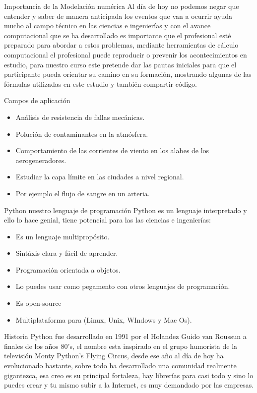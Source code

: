 \begin{frame}{Importancia de la Modelación numérica}
Al día de hoy no podemos negar que entender y saber de manera anticipada los eventos que van a ocurrir ayuda mucho al campo técnico en las ciencias e ingenierías y con el avance computacional que se ha desarrollado es importante que el profesional esté preparado para abordar a estos problemas, mediante herramientas de cálculo computacional el profesional puede reproducir o prevenir los acontecimientos en estudio, para nuestro curso este pretende dar las pautas iniciales para que el participante pueda orientar su camino en su formación, mostrando algunas de las fórmulas utilizadas en este estudio y también compartir código.
\end{frame}

\begin{frame}{Campos de aplicación}
\begin{itemize}
\item Análisis de resistencia de fallas mecánicas.
\item Polución de contaminantes en la atmósfera.
\item Comportamiento de las corrientes de viento en los alabes de los aerogeneradores.
\item Estudiar la capa límite en las ciudades a nivel regional.
\item Por ejemplo el flujo de sangre en un arteria.
\end{itemize}
\end{frame}


\begin{frame}{Python nuestro lenguaje de programación}
Python es un lenguaje interpretado y ello lo hace genial, tiene potencial para las las ciencias e ingenierías:
	\begin{itemize}
	\item Es un lenguaje multipropósito.
	\item Sintáxis clara y fácil de aprender.
	\item Programación orientada a objetos.
	\item Lo puedes usar como pegamento con otros lenguajes de 
	programación.
	\item Es open-source
	\item Multiplataforma para (Linux, Unix, WIndows y Mac Os).
	\end{itemize}
\end{frame}

\begin{frame}{Historia}
Python fue desarrollado en 1991 por el Holandez Guido van Roussun a finales de los años 80's, el nombre esta inspirado en el grupo humorista de la televisión Monty Python's Flying Circus, desde ese año al día de hoy ha evolucionado bastante, sobre todo ha desarrollado una comunidad realmente gigantezca, esa creo es su principal fortaleza, hay librerías para casi todo y sino lo puedes crear y tu mismo subir a la Internet, es muy demandado por las empresas.
\end{frame}

